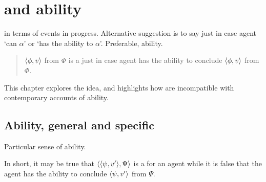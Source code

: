 \chapter{ and ability}
\label{cha:sec:fcs-def:ability}

\begin{note}
   in terms of events in progress.
  Alternative suggestion is to say \fc{} just in case agent `can \(\alpha\)' or `has the ability to \(\alpha\)'.
  Preferable, ability.

  \begin{quote}
    \(\langle\phi, v\rangle\) from \(\Phi\) is a \fc{} just in case agent has the ability to conclude \(\langle\phi, v\rangle\) from \(\Phi\).
  \end{quote}

  This chapter explores the idea, and highlights how  are incompatible with contemporary accounts of ability.
\end{note}





\section{Ability, general and specific}
\label{cha:sec:fcs-def:ability:abil-gener-spec}

\begin{note}
  Particular sense of ability.




  In short, it may be true that \(\langle \langle \psi, v' \rangle, \Psi \rangle\) is a \fc{} for an agent while it is false that the agent has the ability to conclude \(\langle\psi, v'\rangle\) from \(\Psi\).
\end{note}


